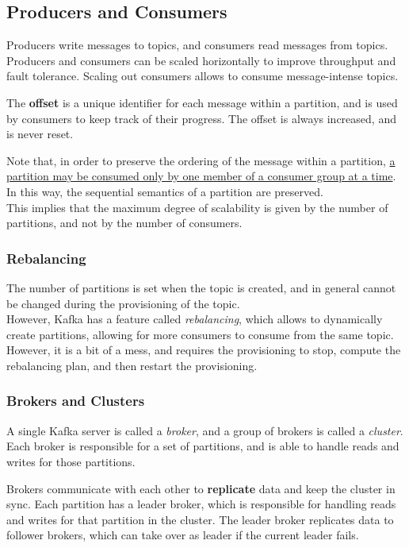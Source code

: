 \subsection{Producers and Consumers}

Producers write messages to topics, and consumers read messages from topics. Producers and consumers can be scaled horizontally to improve throughput and fault tolerance.
Scaling out consumers allows to consume message-intense topics. 

The \textbf{offset} is a unique identifier for each message within a partition, and is used by consumers to keep track of their progress. The offset is always increased, and is never reset.

Note that, in order to preserve the ordering of the message within a partition, \ul{a partition may be consumed only by one member of a consumer group at a time}.\\
In this way, the sequential semantics of a partition are preserved.\\
This implies that the maximum degree of scalability is given by the number of partitions, and not by the number of consumers.

\subsubsection{Rebalancing}
The number of partitions is set when the topic is created, and in general cannot be changed during the provisioning of the topic.\\
However, Kafka has a feature called \textit{rebalancing}, which allows to dynamically create partitions, allowing for more consumers to consume from the same topic.
However, it is a bit of a mess, and requires the provisioning to stop, compute the rebalancing plan, and then restart the provisioning.

\subsubsection{Brokers and Clusters}
A single Kafka server is called a \textit{broker}, and a group of brokers is called a \textit{cluster}. Each broker is responsible for a set of partitions, and is able to handle reads and writes for those partitions.

Brokers communicate with each other to \textbf{replicate} data and keep the cluster in sync. Each partition has a leader broker, which is responsible for handling reads and writes for that partition in the cluster. The leader broker replicates data to follower brokers, which can take over as leader if the current leader fails.

